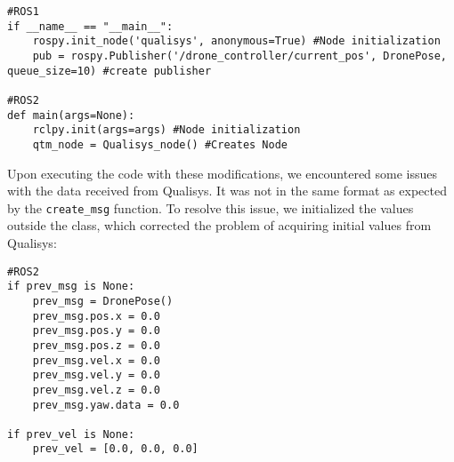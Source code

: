\begin{lstlisting}[language=PythonPlus]
#ROS1
if __name__ == "__main__":
    rospy.init_node('qualisys', anonymous=True) #Node initialization
    pub = rospy.Publisher('/drone_controller/current_pos', DronePose, queue_size=10) #create publisher

#ROS2
def main(args=None):
    rclpy.init(args=args) #Node initialization
    qtm_node = Qualisys_node() #Creates Node
\end{lstlisting}

Upon executing the code with these modifications, we encountered some issues with the data received from Qualisys. It was not in the same format as expected by the \verb|create_msg| function. To resolve this issue, we initialized the values outside the class, which corrected the problem of acquiring initial values from Qualisys:

\begin{lstlisting}[language=PythonPlus]
#ROS2
if prev_msg is None:
    prev_msg = DronePose()
    prev_msg.pos.x = 0.0
    prev_msg.pos.y = 0.0
    prev_msg.pos.z = 0.0
    prev_msg.vel.x = 0.0
    prev_msg.vel.y = 0.0
    prev_msg.vel.z = 0.0
    prev_msg.yaw.data = 0.0

if prev_vel is None:
    prev_vel = [0.0, 0.0, 0.0] 

\end{lstlisting}



